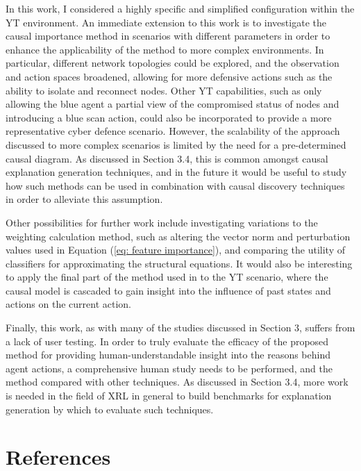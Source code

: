 \documentclass{article}
\begin{document}
In this work, I considered a highly specific and simplified configuration within the YT environment. An immediate extension to this work is to investigate the causal importance method in scenarios with different parameters in order to enhance the applicability of the method to more complex environments. In particular, different network topologies could be explored, and the observation and action spaces broadened, allowing for more defensive actions such as the ability to isolate and reconnect nodes. Other YT capabilities, such as only allowing the blue agent a partial view of the compromised status of nodes and introducing a blue scan action, could also be incorporated to provide a more representative cyber defence scenario. However, the scalability of the approach discussed to more complex scenarios is limited by the need for a pre-determined causal diagram. As discussed in Section 3.4, this is common amongst causal explanation generation techniques, and in the future it would be useful to study how such methods can be used in combination with causal discovery techniques in order to alleviate this assumption. 


Other possibilities for further work include investigating variations to the weighting calculation method, such as altering the vector norm and perturbation values used in Equation (\ref{eq: feature importance}), and comparing the utility of classifiers for approximating the structural equations. It would also be interesting to apply the final part of the method used in \cite{wang2022causal} to the YT scenario, where the causal model is cascaded to gain insight into the influence of past states and actions on the current action.

Finally, this work, as with many of the studies discussed in Section 3, suffers from a lack of user testing. In order to truly evaluate the efficacy of the proposed method for providing human-understandable insight into the reasons behind agent actions, a comprehensive human study needs to be performed, and the method compared with other techniques. As discussed in Section 3.4, more work is needed in the field of XRL in general to build benchmarks for explanation generation by which to evaluate such techniques.


\pagebreak

\section{References}
%
%


\printbibliography[heading=none, stylename = plain]
\end{document}
